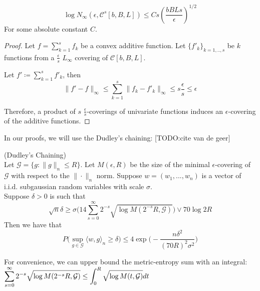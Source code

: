 \begin{lemma}
\[
\log N_\infty( \epsilon, \mathcal{C}^s[b,B,L])  \leq C s \left(\frac{bBLs}{\epsilon}\right)^{1/2}
\]
For some absolute constant $C$.
\end{lemma}

\begin{proof}
Let $f = \sum_{k=1}^s f_k$ be a convex additive function. Let $\{ f'_k \}_{k=1,..,s}$ be $k$ functions from a $\frac{\epsilon}{s}$ $L_\infty$ covering of $\mathcal{C}[b,B,L]$. 

Let $f' \coloneqq \sum_{k=1}^s f'_k$, then 
\[
\| f' - f \|_{\infty} \leq \sum_{k=1}^s \| f_k - f'_k \|_\infty \leq s \frac{\epsilon}{s} \leq \epsilon
\]

Therefore, a product of $s$ $\frac{\epsilon}{s}$-coverings of univariate functions induces an $\epsilon$-covering of the additive functions.
\end{proof}

In our proofs, we will use the Dudley's chaining: [TODO:cite van de geer]

\begin{theorem} (Dudley's Chaining) \\
\label{thm:chaining}
Let $\mathcal{G} = \{ g : \| g \|_n \leq R \}$. Let $M( \epsilon, R)$ be the size of the minimal $\epsilon$-covering of $\mathcal{G}$ with respect to the $\| \cdot \|_n$ norm. Suppose $w = (w_1, ..., w_n)$ is a vector of i.i.d. subgaussian random variables with scale $\sigma$.\\

Suppose $\delta > 0$ is such that
\[
\sqrt{n} \delta \geq \sigma \Big( 
   14 \sum_{s=0}^\infty 2^{-s} \sqrt{ \log M( 2^{-s} R, \mathcal{G})} 
      \Big)\vee 70 \log 2 R
\]
Then we have that 
\[
P\Big( \sup_{g \in \mathcal{G}} \langle w, g \rangle_n \geq \delta \Big) \leq
  4 \exp \Big( - \frac{n \delta^2}{(70R)^2\sigma^2} \Big)
\]
\end{theorem}

For convenience, we can upper bound the metric-entropy sum with an integral: \\
$\displaystyle \sum_{s=0}^\infty 2^{-s} \sqrt{ \log M( 2^{-s} R, \mathcal{G})} 
  \leq \int_0^R \sqrt{\log M(t, \mathcal{G}) } dt
$




 


